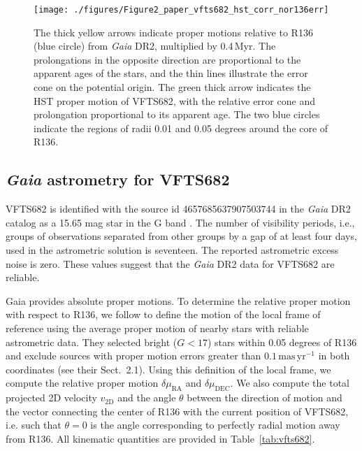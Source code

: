 \documentclass[a4paper,fleqn,usenatbib]{mnras}
\newcommand{\masyr}{\,\mathrm{mas}\,\mathrm{yr}^{-1}}
\DeclareRobustCommand{\Tabref}[1]{Table~\ref{#1}}
\begin{document}
\begin{figure}%
  \centering
  \texttt{[image: ./figures/Figure2\_paper\_vfts682\_hst\_corr\_nor136err]}  
  \caption{The thick yellow arrows indicate proper motions relative to
    R136 (blue
    circle) from \emph{Gaia} DR2, multiplied by 0.4\,Myr. The prolongations in the opposite
    direction are proportional to the apparent ages of the stars, and
    the thin lines illustrate the error cone on the potential
    origin. The green thick arrow
    indicates the HST proper motion of VFTS682, with the relative
    error cone and prolongation proportional to its apparent
    age. The two blue circles indicate the regions of radii 0.01 and 0.05
    degrees around the core of R136.}
  
  \label{fig:main}
\end{figure}

\subsection{ \emph{Gaia} astrometry for VFTS682\label{data:gaia}}


VFTS682 is identified with the source id 4657685637907503744 in the
\emph{Gaia} DR2 catalog %
  as a 15.65 mag star in the G band
\citep{gaia:16,brown:18}.   The number of visibility periods,
i.e., groups of observations separated from other groups by a gap of at
least four days, used in the astrometric solution is seventeen. The reported astrometric excess noise is zero.  These values
suggest that the \emph{Gaia} DR2  data for VFTS682 are
reliable.

Gaia provides absolute proper motions.  To determine the relative
proper motion with respect to R136, we follow  \citet{lennon:18} to
define the motion of the local frame of reference using the average
proper motion of nearby stars with reliable astrometric data.  They
selected bright ($G<17$) stars within 0.05 degrees of R136 and exclude
sources with proper motion errors greater than $0.1\masyr$ in both
coordinates (see their  Sect.~2.1).  Using this definition of the
local frame, we compute the relative proper motion
$\delta\mu_\mathrm{RA}$ and $\delta\mu_\mathrm{DEC}$.   We also compute the total projected 2D velocity
$v_\mathrm{2D}$ and the angle $\theta$ between the direction of motion and the vector
connecting the center of R136 with the current position of VFTS682,
i.e. such that $\theta = 0$ is the angle corresponding to perfectly
radial motion away from R136. All kinematic quantities are provided in
\Tabref{tab:vfts682}. 
\end{document}
